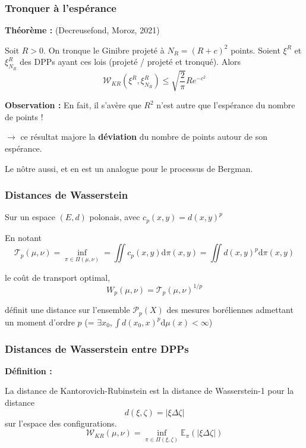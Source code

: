 \documentclass{beamer}
\begin{document}
\begin{frame}
\begin{center}
    \end{center}

\end{frame}\begin{frame}\frametitle{Tronquer à l'espérance}

    \textbf{Théorème :} (Decreusefond, Moroz, 2021)
    
    Soit $R > 0$. On tronque le Ginibre projeté à $ N_R = (R+c)^2 $ points. Soient $ \xi^R $ et $ \xi^R_{N_R} $ des DPPs ayant ces lois (projeté / projeté et tronqué). Alors
    \[
         \mathcal W_{KR}(\xi^R, \xi^R_{N_R}) \leqslant \sqrt{\frac{2}{\pi}} R e^{-c^2}
    \]

    \textbf{Observation :} En fait, il s'avère que $ R^2 $ n'est autre que l'espérance du nombre de points !

    \begin{center}

    $ \rightarrow $ ce résultat majore la \textbf{déviation} du nombre de points autour de son espérance. 

    Le nôtre aussi, et en est un analogue pour le processus de Bergman.

    \end{center}

\end{frame}\begin{frame}\frametitle{Distances de Wasserstein}

    Sur un espace $(E,d)$ polonais, avec $ c_p(x,y) = d(x,y)^p $

    En notant $$ \mathcal T_p(\mu, \nu) = \inf_{\pi \in \Pi(\mu,\nu)} = \iint c_p(x,y) \mathrm d \pi(x,y) = \iint d(x,y)^p \mathrm d \pi(x,y) $$ 

    le coût de transport optimal, $$ W_p(\mu, \nu) = \mathcal T_p(\mu, \nu)^{1/p} $$

    définit une distance sur l'ensemble $ \mathcal P_p(X) $ des mesures boréliennes admettant un moment d'ordre $p$ (= $ \exists x_0, \int d(x_0,x)^p \mathrm d \mu(x) < \infty $)

\end{frame}\begin{frame}\frametitle{Distances de Wasserstein entre DPPs}

    \textbf{Définition :}

    La distance de Kantorovich-Rubinstein est la distance de Wasserstein-1 pour la distance $$ d(\xi, \zeta) = | \xi \Delta \zeta | $$ sur l'espace des configurations. $$ \mathcal W_{KR}(\mu, \nu) = \inf_{\pi \in \Pi(\xi, \zeta)} \mathbb E_\pi(|\xi \Delta \zeta|) $$ 


\end{frame}
\end{document}
